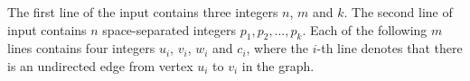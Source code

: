 The first line of the input contains three integers $n$, $m$ and $k$.
The second line of input contains $n$ space-separated integers $p_1,p_2,\ldots,p_k$.
Each of the following $m$ lines contains four integers $u_i$, $v_i$, $w_i$ and $c_i$, where the $i$-th line denotes that there is an undirected edge from vertex $u_i$ to $v_i$ in the graph.